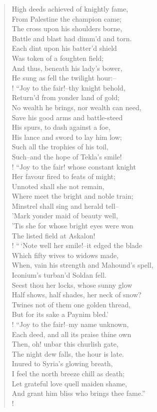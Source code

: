 \begin{verse}
High deeds achieved of knightly fame,\\
From Palestine the champion came;\\
The cross upon his shoulders borne,\\
Battle and blast had dimm'd and torn.\\
Each dint upon his batter'd shield\\
Was token of a foughten field;\\
And thus, beneath his lady's bower,\\
He sung as fell the twilight hour:--\\!
``Joy to the fair!--thy knight behold,\\
Return'd from yonder land of gold;\\
No wealth he brings, nor wealth can need,\\
Save his good arms and battle-steed\\
His spurs, to dash against a foe,\\
His lance and sword to lay him low;\\
Such all the trophies of his toil,\\
Such--and the hope of Tekla's smile!\\!
``Joy to the fair! whose constant knight\\
Her favour fired to feats of might;\\
Unnoted shall she not remain,\\
Where meet the bright and noble train;\\
Minstrel shall sing and herald tell--\\
'Mark yonder maid of beauty well,\\
'Tis she for whose bright eyes were won\\
The listed field at Askalon!\\!
``\,`Note well her smile!--it edged the blade\\
Which fifty wives to widows made,\\
When, vain his strength and Mahound's spell,\\
Iconium's turban'd Soldan fell.\\
Seest thou her locks, whose sunny glow\\
Half shows, half shades, her neck of snow?\\
Twines not of them one golden thread,\\
But for its sake a Paynim bled.'\\!
``Joy to the fair!--my name unknown,\\
Each deed, and all its praise thine own\\
Then, oh! unbar this churlish gate,\\
The night dew falls, the hour is late.\\
Inured to Syria's glowing breath,\\
I feel the north breeze chill as death;\\
Let grateful love quell maiden shame,\\
And grant him bliss who brings thee fame.''\\!
\end{verse}

